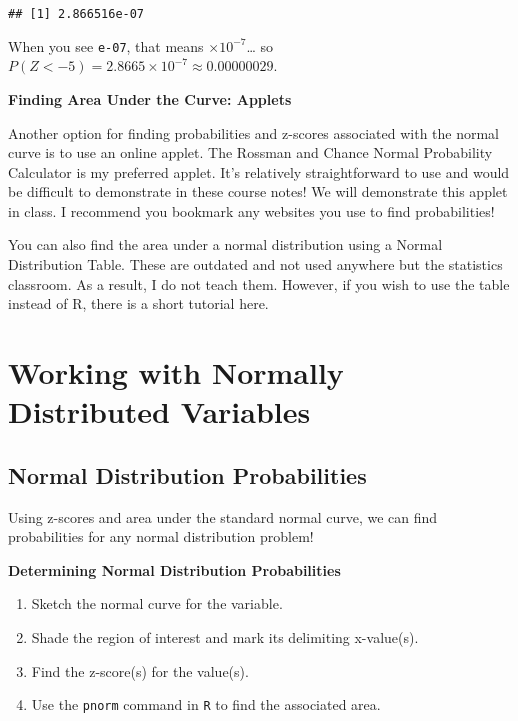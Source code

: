 \documentclass[
]{book}
\providecommand{\tightlist}{%
  \setlength{\itemsep}{0pt}\setlength{\parskip}{0pt}}
\begin{document}
\begin{verbatim}
## [1] 2.866516e-07
\end{verbatim}

When you see \texttt{e-07}, that means \(\times10^{-7}\)\ldots{} so \(P(Z < -5) = 2.8665 \times 10^{-7} \approx 0.00000029\).

\textbf{Finding Area Under the Curve: Applets}

Another option for finding probabilities and z-scores associated with the normal curve is to use an online applet. The Rossman and Chance Normal Probability Calculator is my preferred applet. It's relatively straightforward to use and would be difficult to demonstrate in these course notes! We will demonstrate this applet in class. I recommend you bookmark any websites you use to find probabilities!

You can also find the area under a normal distribution using a Normal Distribution Table. These are outdated and not used anywhere but the statistics classroom. As a result, I do not teach them. However, if you wish to use the table instead of R, there is a short tutorial here.

\hypertarget{working-with-normally-distributed-variables}{%
\section{Working with Normally Distributed Variables}\label{working-with-normally-distributed-variables}}

\hypertarget{normal-distribution-probabilities}{%
\subsection{Normal Distribution Probabilities}\label{normal-distribution-probabilities}}

Using z-scores and area under the standard normal curve, we can find probabilities for any normal distribution problem!

\textbf{Determining Normal Distribution Probabilities}

\begin{enumerate}
\def\labelenumi{\arabic{enumi}.}
\tightlist
\item
  Sketch the normal curve for the variable.
\item
  Shade the region of interest and mark its delimiting x-value(s).
\item
  Find the z-score(s) for the value(s).
\item
  Use the \texttt{pnorm} command in \texttt{R} to find the associated area.
\end{enumerate}
\end{document}
